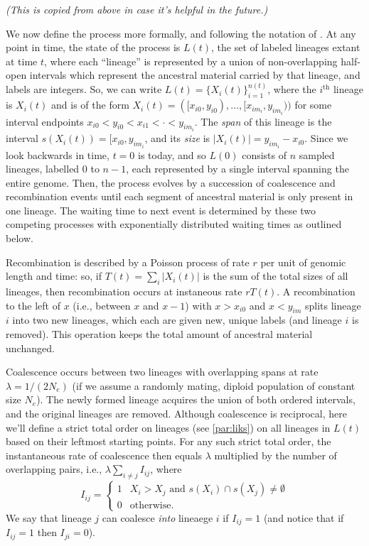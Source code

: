 \documentclass{article}
\newcommand{\comment}[1]{{\it \color{orange} (#1)}}
\begin{document}
\comment{This is copied from above in case it's helpful in the future.}

We now define the process more formally,
and following the notation of \citet{mcvean_approximating_2005}.
At any point in time, the state of the process is $L(t)$,
the set of labeled lineages extant at time $t$,
where each ``lineage'' is represented by a union of non-overlapping half-open intervals
which represent the ancestral material carried by that lineage,
and labels are integers.
So, we can write $L(t) = \{X_i(t)\}_{i=1}^{n(t)}$,
where the $i^\text{th}$ lineage is $X_i(t)$
and is of the form
$X_i(t) = ([x_{i0}, y_{i0}), \dotsc, [x_{im_i}, y_{im_i}))$
for some interval endpoints $x_{i0} < y_{i0} < x_{i1} < \cdot < y_{im_i}$.
The \emph{span} of this lineage is the interval $s(X_i(t)) = [x_{i0}, y_{im_i}$,
and its \emph{size} is $|X_i(t)| = y_{im_i} - x_{i0}$.
Since we look backwards in time, $t=0$ is today, and so
$L(0)$ consists of $n$ sampled lineages, labelled $0$ to $n-1$,
each represented by a single interval spanning the entire genome.
Then, the process evolves by a succession of coalescence and recombination
events until each segment of ancestral material is only present in one lineage.
The waiting time to next event is determined by these two competing processes
with exponentially distributed waiting times as outlined below.

Recombination is described by a Poisson process of rate $r$ per unit of genomic length and time:
so, if $T(t) = \sum_i |X_i(t)|$ is the sum of the total sizes of all lineages,
then recombination occurs at instaneous rate $rT(t)$.
A recombination to the left of $x$
(i.e., between $x$ and $x-1$)
with $x>x_{i0}$ and $x<y_{im}$ splits lineage $i$ into two new lineages,
which each are given new, unique labels
(and lineage $i$ is removed).
This operation keeps the total amount of ancestral material unchanged.

Coalescence occurs between
two lineages with overlapping spans at rate $\lambda = 1/(2N_e)$
(if we assume a randomly mating, diploid population of constant size $N_e$).
The newly formed lineage acquires the union of both ordered intervals, %
and the original lineages are removed.
Although coalescence is reciprocal, here we'll define a strict total order on lineages
(see \ref{par:liks}) on all lineages in $L(t)$ based on their leftmost starting points.
For any such strict total order,
the instantaneous rate of coalescence then equals $\lambda$ multiplied by the number of overlapping pairs,
i.e., $\lambda \sum_{i \neq j} I_{ij}$,
where
\begin{equation} \label{def:coal}
I_{ij} = \begin{cases}
    1 & X_i > X_j \text{ and } s(X_i) \cap s(X_j) \neq \emptyset \\
    0 & \text{otherwise.}
\end{cases}
\end{equation}
We say that lineage $j$ can coalesce \emph{into} lineaege $i$ if $I_{ij} = 1$
(and notice that if $I_{ij} = 1$ then $I_{ji} = 0$).
\end{document}
